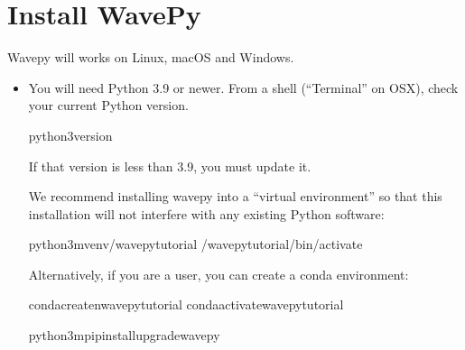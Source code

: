 \documentclass[letterpaper,10pt,english]{sphinxmanual}
\begin{document}
\section{Install WavePy}
\label{\detokenize{installation:install-wavepy}}
\sphinxAtStartPar
Wavepy will works on Linux, macOS and Windows.
\begin{itemize}
\item {} 
\sphinxAtStartPar
You will need Python 3.9 or newer. From a shell (“Terminal” on OSX),
check your current Python version.

\begin{sphinxVerbatim}[commandchars=\\\{\}]
python3\PYGZhy{}\PYGZhy{}version
\end{sphinxVerbatim}

\sphinxAtStartPar
If that version is less than 3.9, you must update it.

\sphinxAtStartPar
We recommend installing wavepy into a “virtual environment” so that this
installation will not interfere with any existing Python software:

\begin{sphinxVerbatim}[commandchars=\\\{\}]
python3\PYGZhy{}mvenv\PYGZti{}/wavepy\PYGZhy{}tutorial
\PYGZti{}/wavepy\PYGZhy{}tutorial/bin/activate
\end{sphinxVerbatim}

\sphinxAtStartPar
Alternatively, if you are a
 user,
you can create a conda environment:

\begin{sphinxVerbatim}[commandchars=\\\{\}]
condacreate\PYGZhy{}nwavepy\PYGZhy{}tutorial
condaactivatewavepy\PYGZhy{}tutorial
\end{sphinxVerbatim}

\begin{sphinxVerbatim}[commandchars=\\\{\}]
python3\PYGZhy{}mpipinstall\PYGZhy{}\PYGZhy{}upgradewavepy
\end{sphinxVerbatim}

\end{itemize}
\end{document}
